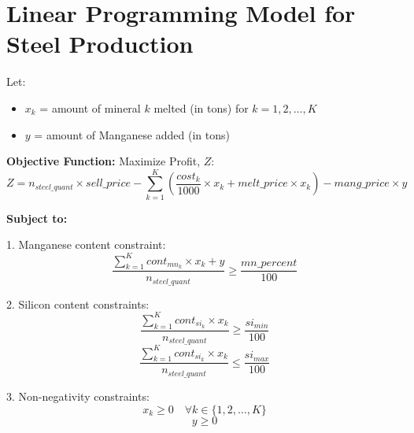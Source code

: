 \documentclass{article}
\begin{document}
\section*{Linear Programming Model for Steel Production}

Let:
\begin{itemize}
    \item \( x_k \) = amount of mineral \( k \) melted (in tons) for \( k = 1, 2, \ldots, K \)
    \item \( y \) = amount of Manganese added (in tons)
\end{itemize}

\textbf{Objective Function:}
Maximize Profit, \( Z \):
\[
Z = n_{steel\_quant} \times sell\_price - \sum_{k=1}^{K} \left( \frac{cost_k}{1000} \times x_k + melt\_price \times x_k \right) - mang\_price \times y
\]

\textbf{Subject to:}

1. Manganese content constraint:
\[
\frac{\sum_{k=1}^{K} cont_{mn_k} \times x_k + y}{n_{steel\_quant}} \geq \frac{mn\_percent}{100}
\]

2. Silicon content constraints:
\[
\frac{\sum_{k=1}^{K} cont_{si_k} \times x_k}{n_{steel\_quant}} \geq \frac{si_{min}}{100}
\]
\[
\frac{\sum_{k=1}^{K} cont_{si_k} \times x_k}{n_{steel\_quant}} \leq \frac{si_{max}}{100}
\]

3. Non-negativity constraints:
\[
x_k \geq 0 \quad \forall k \in \{1, 2, \ldots, K\}
\]
\[
y \geq 0
\]
\end{document}
